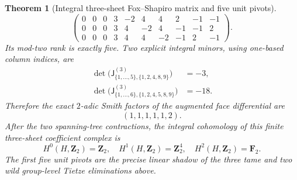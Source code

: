 \documentclass[11pt]{article}
\newtheorem{theorem}{Theorem}[section]
\theoremstyle{definition}
\begin{document}
\begin{theorem}[Integral three-sheet Fox--Shapiro matrix and five unit pivots]
\begin{equation}
{\begin{pmatrix}
0&0&0&3&-2&4&4&2&-1&-1\\
0&0&0&3&4&-2&4&-1&-1&2\\
0&0&0&3&4&4&-2&-1&2&-1
\end{pmatrix}.
}
\end{equation}
Its mod-two rank
is exactly five.
Two explicit
integral minors,
using one-based
column indices,
are
\begin{equation}\label{eq:dyadic-f133-fox-minor-certificates}
\boxed{
\begin{aligned}
\det\bigl(
\mathsf J^{(3)}_{\{1,\dots,5\},
 \{1,2,4,8,9\}}\bigr)&=-3,\\
\det\bigl(
\mathsf J^{(3)}_{\{1,\dots,6\},
 \{1,2,4,5,8,9\}}\bigr)&=-18.
\end{aligned}}
\end{equation}
Therefore the
exact $2$-adic
Smith factors of
the augmented
face differential
are
\begin{equation}\label{eq:dyadic-f133-fox-six-ten-smith}
\boxed{\quad
(1,1,1,1,1,2).
\quad}
\end{equation}
After the two
spanning-tree
contractions,
the integral
cohomology of
this finite
three-sheet
coefficient complex
is
\begin{equation}\label{eq:dyadic-f133-h-trivial-ledger}
\boxed{\quad
H^0(H,\mathbf Z_2)=\mathbf Z_2,\quad
H^1(H,\mathbf Z_2)=\mathbf Z_2^4,\quad
H^2(H,\mathbf Z_2)=\mathbf F_2.
\quad}
\end{equation}
The first five
unit pivots are
the precise
linear shadow of
the three tame
and two wild
group-level
Tietze eliminations
above.
\end{theorem}
\end{document}
